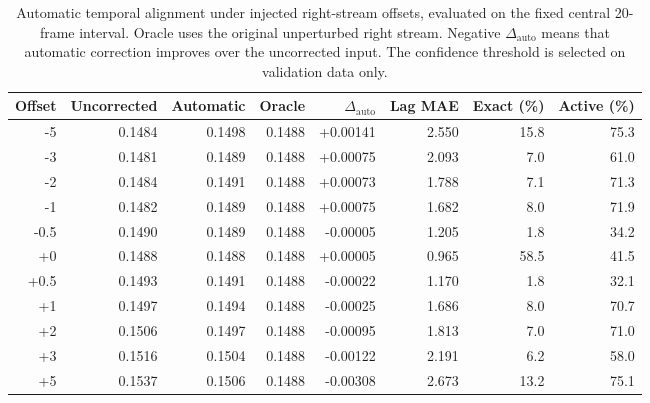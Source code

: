 \begin{table}[t]
\centering
\caption{Automatic temporal alignment under injected right-stream offsets, evaluated on the fixed central 20-frame interval. Oracle uses the original unperturbed right stream. Negative $\Delta_{\mathrm{auto}}$ means that automatic correction improves over the uncorrected input. The confidence threshold is selected on validation data only.}
\label{tab:temporal_alignment}
\footnotesize
\setlength{\tabcolsep}{2.5pt}
\begin{tabular}{rrrrrrrr}
\toprule
Offset & Uncorrected & Automatic & Oracle & $\Delta_{\mathrm{auto}}$ & Lag MAE & Exact (\%) & Active (\%) \\
\midrule
-5 & 0.1484 & 0.1498 & 0.1488 & +0.00141 & 2.550 & 15.8 & 75.3 \\
-3 & 0.1481 & 0.1489 & 0.1488 & +0.00075 & 2.093 & 7.0 & 61.0 \\
-2 & 0.1484 & 0.1491 & 0.1488 & +0.00073 & 1.788 & 7.1 & 71.3 \\
-1 & 0.1482 & 0.1489 & 0.1488 & +0.00075 & 1.682 & 8.0 & 71.9 \\
-0.5 & 0.1490 & 0.1489 & 0.1488 & -0.00005 & 1.205 & 1.8 & 34.2 \\
+0 & 0.1488 & 0.1488 & 0.1488 & +0.00005 & 0.965 & 58.5 & 41.5 \\
+0.5 & 0.1493 & 0.1491 & 0.1488 & -0.00022 & 1.170 & 1.8 & 32.1 \\
+1 & 0.1497 & 0.1494 & 0.1488 & -0.00025 & 1.686 & 8.0 & 70.7 \\
+2 & 0.1506 & 0.1497 & 0.1488 & -0.00095 & 1.813 & 7.0 & 71.0 \\
+3 & 0.1516 & 0.1504 & 0.1488 & -0.00122 & 2.191 & 6.2 & 58.0 \\
+5 & 0.1537 & 0.1506 & 0.1488 & -0.00308 & 2.673 & 13.2 & 75.1 \\
\bottomrule
\end{tabular}
\end{table}
